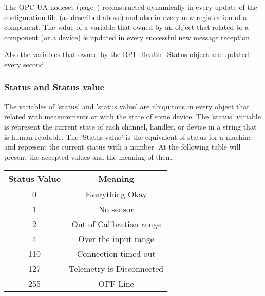 The OPC-UA nodeset (page~\pageref{tree:OPC_UA_nodeset}) reconstructed dynamically in every update of the configuration file (as described above) and also in every new registration of a component.
The value of a variable that owned by an object that related to a component (or a device) is updated in every successful new message reception.

Also the variables that owned by the RPI\_Health\_Status object are updated every second.

\subsubsection{Status and Status value}
 The variables of 'status' and 'status value' are ubiquitous in every object that related with measurements or with the state of some device.
 The 'status' variable is represent the current state of each channel, handler, or device in a string that is human readable. The 'Status value' is the equivalent of status for a machine
 and represent the current status with a number. At the following table will present the accepted values and the meaning of them.
 \begin{center}
 \begin{tabular}{||c | c||}
 \hline
 Status Value & Meaning \\ [0.5ex]
 \hline\hline
 0 & Everything Okay \\
 \hline
 1 & No sensor\\
 \hline
 2 & Out of Calibration range\\
 \hline
 4 & Over the input range\\
 \hline
 110 & Connection timed out\\
 \hline
 127 & Telemetry is Disconnected\\
 \hline
 255 & OFF-Line\\
 \hline
\end{tabular}
\end{center}
